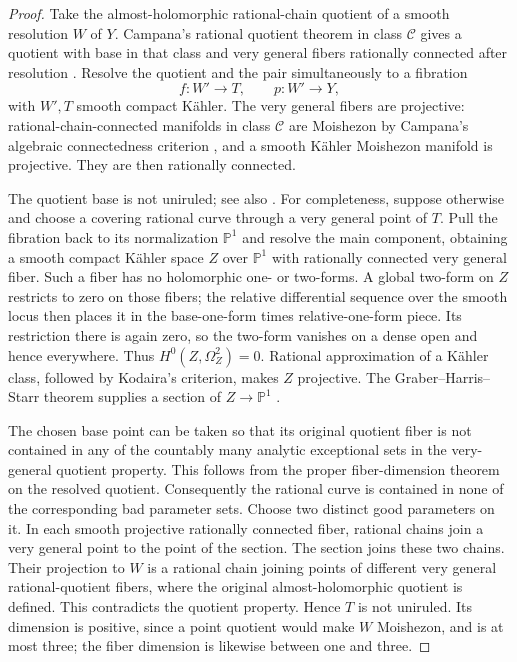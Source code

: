 \documentclass[11pt,letterpaper]{article}
\newcommand{\PP}{\mathbb{P}}
\theoremstyle{definition}
\theoremstyle{remark}
\begin{document}
\begin{proof}
Take the almost-holomorphic rational-chain quotient of a smooth
resolution \(W\) of \(Y\). Campana's rational quotient theorem in class
\(\mathcal C\) gives a quotient with base in that class and very general
fibers rationally connected after resolution
\cite[Theorem~2.6]{CampanaRationalQuotient}. Resolve the quotient and
the pair simultaneously to a fibration
\[
 f:W'\longrightarrow T,\qquad p:W'\longrightarrow Y,
\]
with \(W',T\) smooth compact Kähler. The very general fibers are
projective: rational-chain-connected manifolds in class \(\mathcal C\)
are Moishezon by Campana's algebraic connectedness criterion
\cite{CampanaAlgebraicConnectedness}, and a smooth Kähler Moishezon
manifold is projective. They are then rationally connected.

The quotient base is not uniruled; see also \cite[Lemma~8.10]{OuUniruledness}.
For completeness, suppose otherwise and choose a covering rational
curve through a very general point of \(T\). Pull the fibration back
to its normalization \(\PP^1\) and resolve the main component, obtaining
a smooth compact Kähler space \(Z\) over \(\PP^1\) with rationally
connected very general fiber. Such a fiber has no holomorphic one- or
two-forms. A global two-form on \(Z\) restricts to zero on those fibers;
the relative differential sequence over the smooth locus then places
it in the base-one-form times relative-one-form piece. Its restriction
there is again zero, so the two-form vanishes on a dense open and hence
everywhere. Thus \(H^0(Z,\Omega_Z^2)=0\). Rational approximation of a
Kähler class, followed by Kodaira's criterion, makes \(Z\) projective.
The Graber--Harris--Starr theorem supplies a section of
\(Z\to\PP^1\) \cite{GraberHarrisStarr}.

The chosen base point can be taken so that its original quotient fiber
is not contained in any of the countably many analytic exceptional
sets in the very-general quotient property. This follows from the
proper fiber-dimension theorem on the resolved quotient. Consequently
the rational curve is contained in none of the corresponding bad
parameter sets. Choose two distinct good parameters on it. In each
smooth projective rationally connected fiber, rational chains join a
very general point to the point of the section. The section joins
these two chains. Their projection to \(W\) is a rational chain joining
points of different very general rational-quotient fibers, where the
original almost-holomorphic quotient is defined. This contradicts the
quotient property. Hence \(T\) is not uniruled. Its dimension is
positive, since a point quotient would make \(W\) Moishezon, and is at
most three; the fiber dimension is likewise between one and three.


\end{proof}
\end{document}
